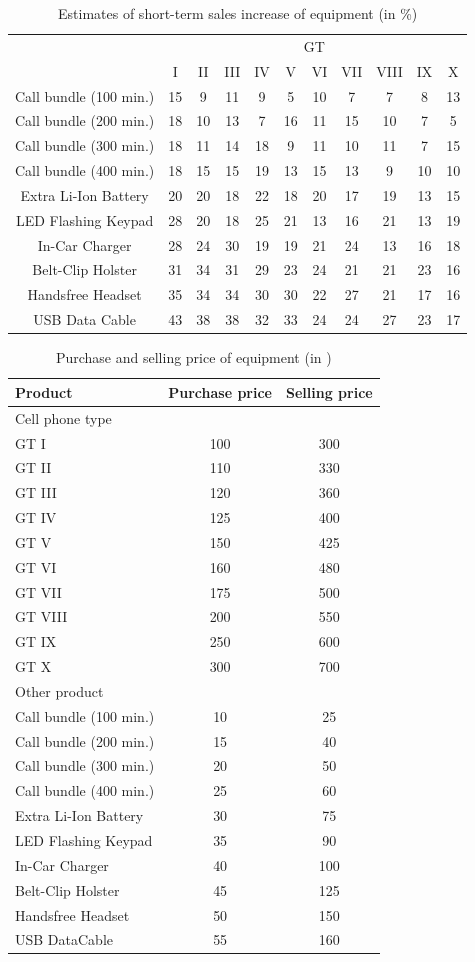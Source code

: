 \begin{table}[H]
	\centering
	\caption{Estimates of short-term sales increase of equipment (in \%)}
	\begin{tabular}{c|*{10}c}\hline
	\multirow{2}{*}{} & \multicolumn{10}{|c}{GT} \\ \cline{2-11}
	&I&II&III&IV&V&VI&VII&VIII&IX&X\\ \hline
Call bundle (100 min.)&15&9&11&9&5&10&7&7&8&13\\ 
Call bundle (200 min.)&18&10&13&7&16&11&15&10&7&5\\ 
Call bundle (300 min.)&18&11&14&18&9&11&10&11&7&15\\ 
Call bundle (400 min.)&18&15&15&19&13&15&13&9&10&10\\ 
Extra Li-Ion Battery&20&20&18&22&18&20&17&19&13&15\\ 
LED Flashing Keypad&28&20&18&25&21&13&16&21&13&19\\ 
In-Car Charger&28&24&30&19&19&21&24&13&16&18\\ 
Belt-Clip Holster&31&34&31&29&23&24&21&21&23&16\\ 
Handsfree Headset&35&34&34&30&30&22&27&21&17&16\\ 
USB Data Cable&43&38&38&32&33&24&24&27&23&17\\
\hline
	\end{tabular}
	\label{inc}
\end{table}

\begin{table}[H]
	\centering
	\caption{Purchase and selling price of equipment (in \texteuro)}
	\begin{tabular}{l|cc}\hline
	Product & Purchase price & Selling price \\ \hline
Cell phone type & & \\ \cline{1-1}
GT I&100&300\\ 
GT II&110&330\\ 
GT III&120&360\\ 
GT IV&125&400\\ 
GT V&150&425\\ 
GT VI&160&480\\ 
GT VII&175&500\\ 
GT VIII&200&550\\ 
GT IX&250&600\\ 
GT X&300&700\\ \hline\hline
Other product & & \\ \hline
Call bundle (100 min.)&10&25\\ 
Call bundle (200 min.)&15&40\\ 
Call bundle (300 min.)&20&50\\ 
Call bundle (400 min.)&25&60\\ 
Extra Li-Ion Battery&30&75\\ 
LED Flashing Keypad&35&90\\ 
In-Car Charger&40&100\\ 
Belt-Clip Holster&45&125\\ 
Handsfree Headset&50&150\\ 
USB DataCable&55&160	\\ \hline
	\end{tabular}
	\label{price}
\end{table}

